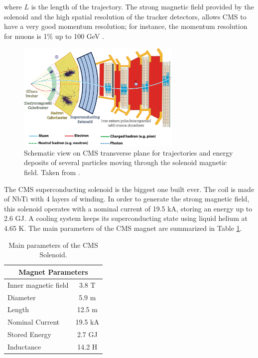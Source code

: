 \noindent where $L$ is the length of the trajectory. The strong magnetic field provided by the solenoid 
and the high spatial resolution of the tracker detectors, allows CMS to have 
a very good momentum resolution; for instance, the momentum resolution for muons 
is 1$\%$ up to 100 GeV \cite{chp2:CMSTDR2}.\\


\begin{figure}[ht]
    \begin{center}
      \includegraphics[width=0.7\textwidth]{figuras/Chapter2/CMStrajectories.png}
      \caption{Schematic view on CMS transverse plane for trajectories and energy deposits of several 
      particles moving through the solenoid magnetic field. Taken from \cite{Barney:2120661}.
      } \label{figchp2:CMStrajectories}
    \end{center}
 \end{figure}

\noindent The CMS superconducting solenoid is the biggest one built ever. The coil is made of NbTi with 4 layers of winding. In order to 
generate the strong magnetic field, this solenoid operates
with a nominal current of 19.5 kA, storing an energy up to 2.6 GJ. A cooling system
keeps its superconducting state using liquid helium at 4.65 K. The 
main parameters of the CMS magnet are summarized in Table \ref{tablechp2:Solenoid}.

\begin{table}[h]
\centering
\begin{tabular}{|l|c|}\hline \hline
\multicolumn{2}{|c|}{Magnet Parameters}  \\ \hline \hline
Inner magnetic field   &  3.8 T  \\ \hline
Diameter               &  5.9 m  \\ \hline
Length                 &  12.5 m  \\ \hline
Nominal Current        &  19.5 kA \\ \hline
Stored Energy          &  2.7 GJ  \\ \hline
Inductance             &  14.2 H  \\ \hline \hline
\end{tabular}
\caption{Main parameters of the CMS Solenoid.} \label{tablechp2:Solenoid}
\end{table}



